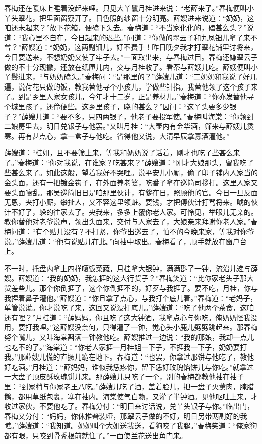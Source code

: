春梅还在暖床上睡着没起来哩。只见大丫鬟月桂进来说：“老薛来了。”春梅便叫小丫头翠花，把里面窗寮开了。日色照的纱窗十分明亮。薛嫂进来说道：“奶奶，这咱还未起来？”放下花箱，便磕下头去。春梅道：“不当家化化的，磕甚么头？”说道：“我心里不自在，今日起来的迟些。”问道：“你做的翠云子和九凤钿儿拿了来不曾？”薛嫂道：“奶奶，这两副钿儿，好不费手！昨日晚夕我才打翠花铺里讨将来，今日要送来，不想奶奶又使了牢子去。”一面取出来，与春梅过目。春梅还嫌翠云子做的不十分现撇，还放在纸匣儿内，交与月桂收了。看茶与薛嫂儿吃。薛嫂便叫小丫鬟进来，“与奶奶磕头。”春梅问：“是那里的？”薛嫂儿道：“二奶奶和我说了好几遍，说荷花只做的饭，教我替他寻个小孩儿，学做些针指。我替他领了这个孩子来了。到是乡里人家女孩儿，今年才十二岁，正是养材儿。”春梅道：“你亦发替他寻个城里孩子，还伶便些。这乡里孩子，晓的甚么？”因问：“这丫头要多少银子？”薛嫂儿道：“要不多，只四两银子，他老子要投军使。”春梅叫海棠：“你领到二娘房里去，明日兑银子与他罢。”又叫月桂：“大壶内有金华酒，筛来与薛嫂儿烫寒。再有甚点心，拿一盒子与他吃。省得他又说，大清早辰拿寡酒灌他。”

薛嫂道：“桂姐，且不要筛上来，等我和奶奶说了话着，刚才也吃了些甚么来了。”春梅道：“你对我说，在谁家？吃甚来？”薛嫂道：“刚才大娘那头，留我吃了些甚么来了。如此这般，望着我好不哭哩。说平安儿小厮，偷了印子铺内人家当的金头面，还有一把镀金钩子，在外面养老婆，吃番子拿在巡简司拶打。这里人家又要头面嚷乱。那吴巡简旧日是咱那里伙计，有爹在日，照顾他的官。今日一旦反面无恩，夹打小厮，攀扯人，又不容这里领赃。要钱，才把傅伙计打骂将来。唬的伙计不好了，躲的往家去了。央我来，多多上覆你老人家。可怜见，举眼儿无亲的。教你替他对老爷说声，领出头面来，交付与人家去了，大娘亲来拜谢你老人家。”春梅问道：“有个贴儿没有？不打紧，你爷出巡去了，怕不的今晚来家，等我对你爷说。”薛嫂儿道：“他有说贴儿在此。”向袖中取出。春梅看了，顺手就放在窗户台上。

不一时，托盘内拿上四样嗄饭菜蔬，月桂拿大银钟，满满斟了一钟，流沿儿递与薛嫂。薛嫂道：“我的奶奶，我怎捱的这大行货子？”春梅笑道：“比你家老头子那大货差些儿。那个你倒捱了，这个你倒捱不的，好歹与我捱了。要不吃，月桂，你与我捏着鼻子灌他。”薛嫂道：“你且拿了点心，与我打个底儿着。”春梅道：“老妈子，单管说谎。你才说吃了来，这回又说没打底儿。”薛嫂道：“吃了他两个茶食，这咱还有哩？”月桂道：“薛妈妈，你且吃了这大钟酒，我拿点心与你吃。俺奶奶怪我没用，要打我哩。”这薛嫂没奈何，只得灌了一钟，觉心头小鹿儿劈劈跳起来。那春梅努个嘴儿，又叫海棠斟满一钟教他吃。薛嫂推过一边说：“我的那娘，我却一点儿也吃不的了。”海棠道：“你老人家捱一月桂姐一下子，不捱我一下子，奶奶要打我。”那薛嫂儿慌的直撅儿跪在地下。春梅道：“也罢，你拿过那饼与他吃了，教他好吃酒。”月桂道：“薛妈妈，谁似我恁疼你，留下恁好玫瑰馅饼儿与你吃。”就拿过一大盘子顶皮酥玫瑰饼儿来。那薛嫂儿只吃了一个，别的春梅都教他袖在袖子里：“到家稍与你家老王八吃。”薛嫂儿吃了酒，盖着脸儿，把一盘子火薰肉，腌腊鹅，都用草纸包裹，塞在袖内。海棠使气白赖，又灌了半钟酒。见他呕吐上来，才收过家伙，不要他吃了。春梅分付：“明日来讨话说，兑丫头银子与你。”临出门，春梅又分付：“妈妈，你休推聋装哑，那翠云子做的不好，明日另带两副好的我瞧。”薛嫂道：“我知道。奶奶叫个大姐送我送，看狗咬了我腿。”春梅笑道：“俺家狗都有眼，只咬到骨秃根前就住了。”一面使兰花送出角门来。

